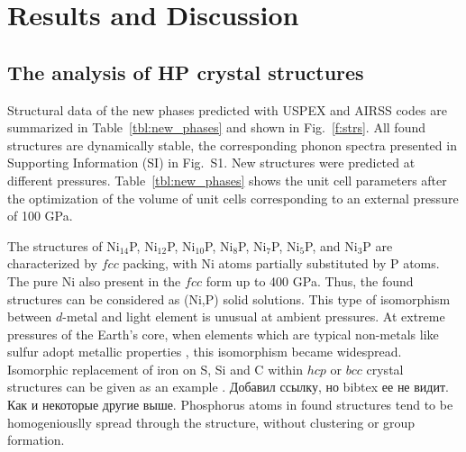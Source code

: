 \documentclass[twoside,twocolumn,9pt]{article}
\begin{document}
\section{Results and Discussion}

\subsection{The analysis of HP crystal structures}
Structural data of the new phases predicted with USPEX and AIRSS codes are summarized in Table~\ref{tbl:new_phases} and shown in Fig.~\ref{f:strs}. 
All found structures are dynamically stable, the corresponding phonon spectra presented in Supporting Information (SI) {\color{blue} in Fig.~S1.}
{\color{blue}
New structures were predicted at different pressures. 
Table~\ref{tbl:new_phases} shows the unit cell parameters after the optimization of the volume of unit cells corresponding to an external pressure of 100 GPa.
}

The structures of Ni$_{14}$P, Ni$_{12}$P, Ni$_{10}$P, Ni$_8$P, Ni$_7$P, Ni$_5$P, and Ni$_3$P are characterized by $fcc$ packing, with Ni atoms partially substituted by P atoms. 
The pure Ni also present in the $fcc$ form up to 400 GPa.
Thus, the found structures can be considered as (Ni,P) solid solutions.
This type of isomorphism between $d$-metal and light element is unusual at ambient pressures.
At extreme pressures of the Earth's core, when elements which are typical non-metals like sulfur adopt metallic properties \cite{gavr2017_s}, this isomorphism became widespread.
Isomorphic replacement of iron on S, Si and C within $hcp$ or $bcc$ crystal structures can be given as an example \cite{gavr2016_fes, LI2018118}.
{\color{blue} Добавил ссылку, но bibtex ее не видит. Как и некоторые другие выше. 
}
Phosphorus atoms in found structures tend to be homogeniouslly spread through the structure, without clustering or group formation.
\end{document}
